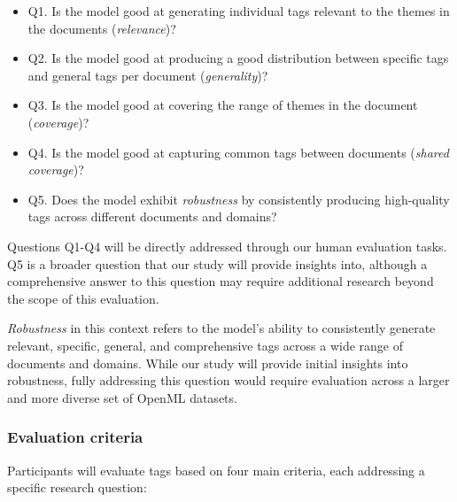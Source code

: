 \begin{itemize}
\item Q1. Is the model good at generating individual tags relevant to the themes in the documents (\textit{relevance})?
\item Q2. Is the model good at producing a good distribution between specific tags and general tags per document (\textit{generality})?
\item Q3. Is the model good at covering the range of themes in the document (\textit{coverage})?
\item Q4. Is the model good at capturing common tags between documents (\textit{shared coverage})?
\item Q5. Does the model exhibit \textit{robustness} by consistently producing high-quality tags across different documents and domains?
\end{itemize}

Questions Q1-Q4 will be directly addressed through our human evaluation tasks. Q5 is a broader question that our study will provide insights into, although a comprehensive answer to this question may require additional research beyond the scope of this evaluation.

\textit{Robustness} in this context refers to the model's ability to consistently generate relevant, specific, general, and comprehensive tags across a wide range of documents and domains. While our study will provide initial insights into robustness, fully addressing this question would require evaluation across a larger and more diverse set of OpenML datasets.

\subsubsection{Evaluation criteria}
Participants will evaluate tags based on four main criteria, each addressing a specific research question:

